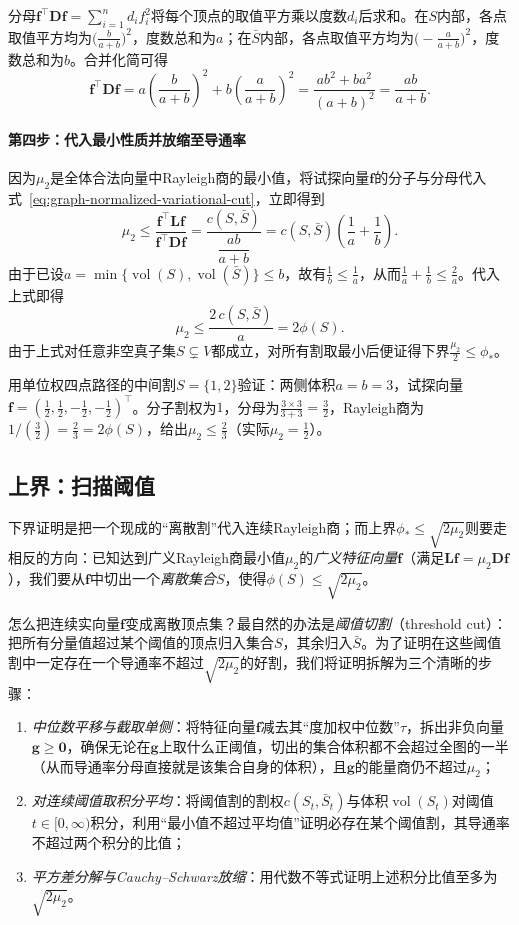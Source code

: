 分母$\bm f^\top\bm D\bm f=\sum_{i=1}^n d_i f_i^2$将每个顶点的取值平方乘以度数$d_i$后求和。在$S$内部，各点取值平方均为$\bigl(\frac{b}{a+b}\bigr)^2$，度数总和为$a$；在$\bar S$内部，各点取值平方均为$\bigl(-\frac{a}{a+b}\bigr)^2$，度数总和为$b$。合并化简可得
\[
\bm f^\top\bm D\bm f
=a\left(\frac{b}{a+b}\right)^{\!2}
+b\left(\frac{a}{a+b}\right)^{\!2}
=\frac{ab^2+ba^2}{(a+b)^2}
=\frac{ab}{a+b}.
\]

\paragraph{第四步：代入最小性质并放缩至导通率}

因为$\mu_2$是全体合法向量中Rayleigh商的最小值，将试探向量$\bm f$的分子与分母代入式~\eqref{eq:graph-normalized-variational-cut}，立即得到
\[
\mu_2
\leq \frac{\bm f^\top\bm L\bm f}{\bm f^\top\bm D\bm f}
=\frac{c(S,\bar S)}{\dfrac{ab}{a+b}}
=c(S,\bar S)\left(\frac{1}{a}+\frac{1}{b}\right).
\]
由于已设$a=\min\{\operatorname{vol}(S),\operatorname{vol}(\bar S)\}\leq b$，故有$\frac{1}{b}\leq\frac{1}{a}$，从而$\frac{1}{a}+\frac{1}{b}\leq\frac{2}{a}$。代入上式即得
\[
\mu_2 \leq \frac{2\,c(S,\bar S)}{a} = 2\phi(S).
\]
由于上式对任意非空真子集$S\subsetneq V$都成立，对所有割取最小后便证得下界$\frac{\mu_2}{2}\leq\phi_*$。

用单位权四点路径的中间割$S=\{1,2\}$验证：两侧体积$a=b=3$，试探向量$\bm f=(\frac12,\frac12,-\frac12,-\frac12)^\top$。分子割权为$1$，分母为$\frac{3\times 3}{3+3}=\frac32$，Rayleigh商为$1/(\frac32)=\frac23=2\phi(S)$，给出$\mu_2\leq\frac23$（实际$\mu_2=\frac12$）。

\subsection{上界：扫描阈值}
\label{sec:graph-cheeger-sweep}

下界证明是把一个现成的“离散割”代入连续Rayleigh商；而上界$\phi_*\leq\sqrt{2\mu_2}$则要走相反的方向：已知达到广义Rayleigh商最小值$\mu_2$的\emph{广义特征向量}$\bm f$（满足$\bm L\bm f=\mu_2\bm D\bm f$），我们要从$\bm f$中切出一个\emph{离散集合}$S$，使得$\phi(S)\leq\sqrt{2\mu_2}$。

怎么把连续实向量$\bm f$变成离散顶点集？最自然的办法是\emph{阈值切割}（threshold cut）：把所有分量值超过某个阈值的顶点归入集合$S$，其余归入$\bar S$。为了证明在这些阈值割中一定存在一个导通率不超过$\sqrt{2\mu_2}$的好割，我们将证明拆解为三个清晰的步骤：
\begin{enumerate}
\item \emph{中位数平移与截取单侧}：将特征向量$\bm f$减去其“度加权中位数”$\tau$，拆出非负向量$\bm g\geq\bm 0$，确保无论在$\bm g$上取什么正阈值，切出的集合体积都不会超过全图的一半（从而导通率分母直接就是该集合自身的体积），且$\bm g$的能量商仍不超过$\mu_2$；
\item \emph{对连续阈值取积分平均}：将阈值割的割权$c(S_t,\bar S_t)$与体积$\operatorname{vol}(S_t)$对阈值$t\in[0,\infty)$积分，利用“最小值不超过平均值”证明必存在某个阈值割，其导通率不超过两个积分的比值；
\item \emph{平方差分解与Cauchy--Schwarz放缩}：用代数不等式证明上述积分比值至多为$\sqrt{2\mu_2}$。
\end{enumerate}

